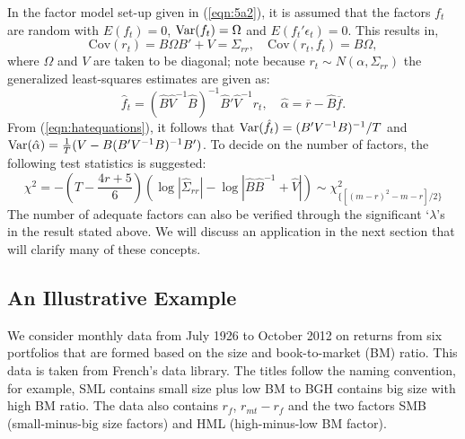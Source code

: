 	
In the factor model set-up given in (\ref{eqn:5a2}), it is assumed that the factors $f_t$ are random with $E(f_t)=0$, $\operatorname{Var}(f_t)=\Omega$ and $E(f_t'\epsilon_t)=0$. This results in,
	\begin{equation} \label{eqn:covdouble}
	\text{Cov}(r_t)= B\Omega B' + V = \Sigma_{rr}, \quad \text{Cov}(r_t,f_t)= B \Omega,
	\end{equation}
where $\Omega$ and $V$ are taken to be diagonal; note because $r_t \sim N(\alpha,\Sigma_{rr})$ the generalized least-squares estimates are given as:
	\begin{equation} \label{eqn:hatequations}
	\hat{f}_t= (\hat{B} \hat{V}^{-1} \hat{B})^{-1} \hat{B}' \hat{V}^{-1} r_t, \quad \hat{\alpha}= \overline{r} - \hat{B} \overline{f}.
	\end{equation}	
From (\ref{eqn:hatequations}), it follows that $\operatorname{Var}(\hat{f}_t)= (B' V^{-1} B)^{-1}/T$ and $\operatorname{Var}(\hat{\alpha})=\frac{1}{T}(V - B(B' V^{-1}B)^{-1}B')$. To decide on the number of factors, the following test statistics is suggested:
	\begin{equation} \label{eqn:5chi}
	\chi^2= -\left(T- \frac{4r+5}{6} \right) \left(\log |\hat{\Sigma}_{rr}| - \log |\hat{B}\hat{B}^{-1} + \hat{V}| \right)  \sim \chi^2_{\{[(m-r)^2-m-r]/2\}}
	\end{equation}	
The number of adequate factors can also be verified through the significant `$\lambda$'s in the result stated above. We will discuss an application in the next section that will clarify many of these concepts. 
	

\subsection{An Illustrative Example}


We consider monthly data from July 1926 to October 2012 on returns from six portfolios that are formed based on the size and book-to-market (BM) ratio. This data is taken from French's data library. The titles follow the naming convention, for example, SML contains small size plus low BM to BGH contains big size with high BM ratio. The data also contains $r_f$, $r_{mt}-r_f$ and the two factors SMB (small-minus-big size factors) and HML (high-minus-low BM factor).


